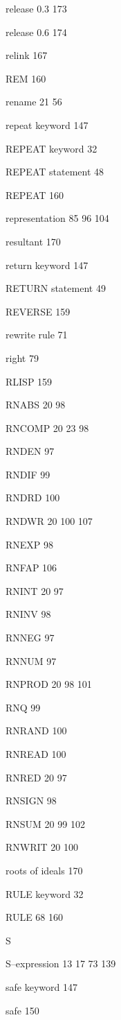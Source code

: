 \item release 0.3 173
\item release 0.6 174
\item relink 167
\item REM 160
\item rename  21 56
\item repeat keyword 147
\item REPEAT keyword 32
\item REPEAT statement 48
\item REPEAT 160
\item representation  85 96 104
\item resultant 170
\item return keyword 147
\item RETURN statement 49
\item REVERSE 159
\item rewrite rule 71
\item right 79
\item RLISP 159
\item RNABS  20 98
\item RNCOMP  20 23 98
\item RNDEN 97
\item RNDIF 99
\item RNDRD 100
\item RNDWR   20  100 107
\item RNEXP 98
\item RNFAP 106
\item RNINT  20 97
\item RNINV 98
\item RNNEG 97
\item RNNUM 97
\item RNPROD  20 98 101
\item RNQ 99
\item RNRAND 100
\item RNREAD 100
\item RNRED  20 97
\item RNSIGN 98
\item RNSUM  20 99 102
\item RNWRIT   20 100
\item roots of ideals 170
\item RULE keyword 32
\item RULE  68 160
\indexspace
\item {\Large S}
\item S--expression  13 17 73 139
\item safe keyword 147
\item safe 150
